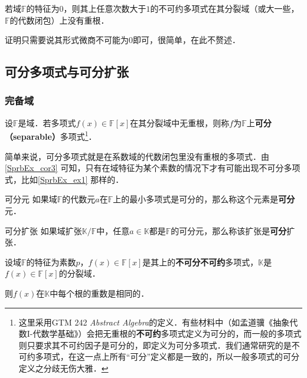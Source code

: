 \begin{corollary}{}\label{SprbEx_cor3}

若域$\mathbb{F}$的特征为$0$，则其上任意次数大于$1$的不可约多项式在其分裂域（或大一些，$\mathbb{F}$的代数闭包）上没有重根．

\end{corollary}

证明只需要说其形式微商不可能为$0$即可，很简单，在此不赘述．




\subsection{可分多项式与可分扩张}



\subsubsection{完备域}



\begin{definition}{}\label{SprbEx_def2}

设$\mathbb{F}$是域．若多项式$f(x)\in\mathbb{F}[x]$在其分裂域中无重根，则称$f$为$\mathbb{F}$上\textbf{可分（separable）}多项式\footnote{这里采用GTM 242 \textsl{Abstract Algebra}的定义．有些材料中（如孟道骥《抽象代数I-代数学基础》）会把无重根的\textbf{不可约}多项式定义为可分的，而一般的多项式则只要求其不可约因子是可分的，即定义为可分多项式．我们通常研究的是不可约多项式，在这一点上所有“可分”定义都是一致的，所以一般多项式的可分定义之分歧无伤大雅．}．


\end{definition}

简单来说，可分多项式就是在系数域的代数闭包里没有重根的多项式．由\autoref{SprbEx_cor3} 可知，只有在域特征为某个素数的情况下才有可能出现不可分多项式，比如\autoref{SprbEx_ex1} 那样的．


\begin{definition}{可分元}
如果域$\mathbb{F}$的代数元$a$在$\mathbb{F}$上的最小多项式是可分的，那么称这个元素是\textbf{可分}元．
\end{definition}

\begin{definition}{可分扩张}
如果域扩张$\mathbb{K}/\mathbb{F}$中，任意$a\in\mathbb{K}$都是$\mathbb{F}$的可分元，那么称该扩张是\textbf{可分}扩张．
\end{definition}



\begin{theorem}{}\label{SprbEx_the3}
设域$\mathbb{F}$的特征为素数$p$，$f(x)\in\mathbb{F}[x]$是其上的\textbf{不可分不可约}多项式，$\mathbb{K}$是$f(x)\in\mathbb{F}[x]$的分裂域．

则$f(x)$在$\mathbb{K}$中每个根的重数是相同的．
\end{theorem}

